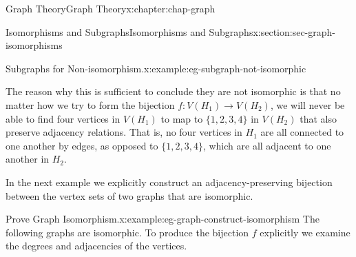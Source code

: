 \documentclass[oneside,10pt,]{book}
\numberwithin{equation}{section}
\begin{document}
\begin{chapterptx}{Graph Theory}{}{Graph Theory}{}{}{x:chapter:chap-graph}
\begin{sectionptx}{Isomorphisms and Subgraphs}{}{Isomorphisms and Subgraphs}{}{}{x:section:sec-graph-isomorphisms}
\begin{example}{Subgraphs for Non-isomorphism.}{x:example:eg-subgraph-not-isomorphic}
\begin{sidebyside}{3}{0.0583333333333333}{0.0583333333333333}{0.116666666666667}
\begin{sbspanel}{0.25}
{
}%
\end{sbspanel}%
\end{sidebyside}%
\par
The reason why this is sufficient to conclude they are not isomorphic is that no matter how we try to form the bijection \(f: V(H_1) \rightarrow V(H_2)\), we will never be able to find four vertices in \(V(H_1)\) to map to \(\{1,2,3,4\}\) in \(V(H_2)\) that also preserve adjacency relations. That is, no four vertices in \(H_1\) are all connected to one another by edges, as opposed to \(\{1,2,3,4\}\), which are all adjacent to one another in \(H_2\).%
\end{example}
In the next example we explicitly construct an adjacency-preserving bijection between the vertex sets of two graphs that are isomorphic.%
\begin{example}{Prove Graph Isomorphism.}{x:example:eg-graph-construct-isomorphism}%
The following graphs are isomorphic. To produce the bijection \(f\) explicitly we examine the degrees and adjacencies of the vertices.%
\begin{sidebyside}{2}{0.22}{0.22}{0.16}%
\begin{sbspanel}{0.2}%
\end{sbspanel}
\end{sidebyside}
\end{example}
\end{sectionptx}
\end{chapterptx}
\end{document}
